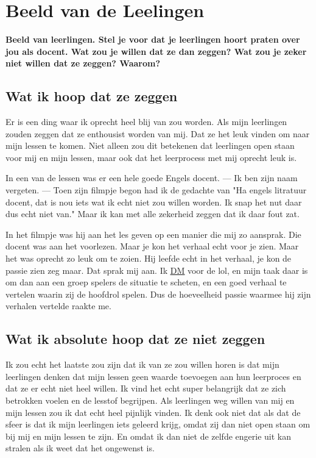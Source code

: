     \section{Beeld van de Leelingen}
        \textbf{Beeld van leerlingen. Stel je voor dat je leerlingen hoort praten over jou als docent. Wat zou je willen dat ze dan zeggen? Wat zou je zeker niet willen dat ze zeggen? Waarom?}

        \subsection{Wat ik hoop dat ze zeggen}
            Er is een ding waar ik oprecht heel blij van zou worden. Als mijn leerlingen zouden zeggen dat ze enthousist worden van mij. Dat ze het leuk vinden om naar mijn lessen te komen. Niet alleen zou dit betekenen dat leerlingen open staan voor mij en mijn lessen, maar ook dat het leerprocess met mij oprecht leuk is. 

            \bigskip

            \noindent In een van de lessen was er een hele goede Engels docent. — Ik ben zijn naam vergeten. — Toen zijn filmpje begon had ik de gedachte van "Ha engels litratuur docent, dat is nou iets wat ik echt niet zou willen worden. Ik snap het nut daar dus echt niet van." Maar ik kan met alle zekerheid zeggen dat ik daar fout zat. 
            
            \bigskip

            \noindent In het filmpje was hij aan het les geven op een manier die mij zo aansprak. Die docent was aan het voorlezen. Maar je kon het verhaal echt voor je zien. Maar het was oprecht zo leuk om te zoien. Hij leefde echt in het verhaal, je kon de passie zien zeg maar. Dat sprak mij aan. Ik \hyperlink{https://en.wikipedia.org/wiki/Dungeon_Master}{\underline{DM}} voor de lol, en mijn taak daar is om dan aan een groep spelers de situatie te scheten, en een goed verhaal te vertelen waarin zij de hoofdrol spelen. Dus de hoeveelheid passie waarmee hij zijn verhalen vertelde raakte me.

        \subsection{Wat ik absolute hoop dat ze niet zeggen}
            Ik zou echt het laatste zou zijn dat ik van ze zou willen horen is dat mijn leerlingen denken dat mijn lessen geen waarde toevoegen aan hun leerproces en dat ze er echt niet heel willen. Ik vind het echt super belangrijk dat ze zich betrokken voelen en de lesstof begrijpen. Als leerlingen weg willen van mij en mijn lessen zou ik dat echt heel pijnlijk vinden. Ik denk ook niet dat als dat de sfeer is dat ik mijn leerlingen iets geleerd krijg, omdat zij dan niet open staan om bij mij en mijn lessen te zijn. En omdat ik dan niet de zelfde engerie uit kan stralen als ik weet dat het ongewenst is.

    \newpage

